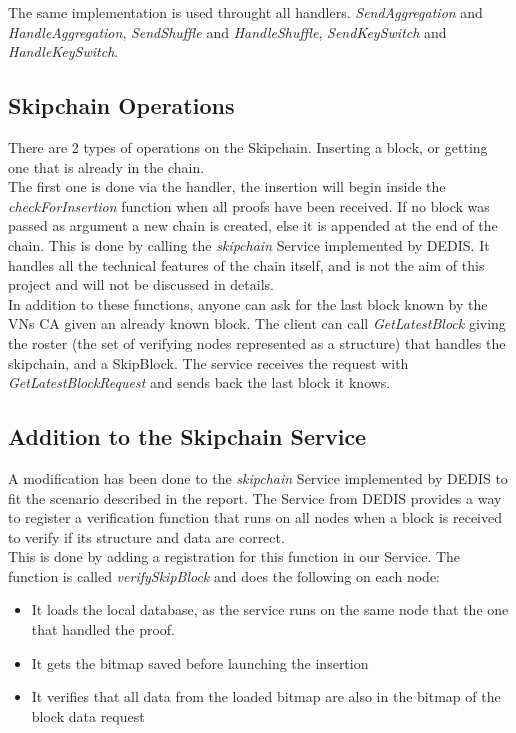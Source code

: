 \documentclass{article}
\begin{document}
The same implementation is used throught all handlers. \textit{SendAggregation} and \textit{HandleAggregation}, \textit{SendShuffle} and \textit{HandleShuffle}, \textit{SendKeySwitch} and \textit{HandleKeySwitch}.

\subsection{Skipchain Operations}
There are 2 types of operations on the Skipchain. Inserting a block, or getting one that is already in the chain.\\
The first one is done via the handler, the insertion will begin inside the \textit{checkForInsertion} function when all proofs have been received. If no block was passed as argument a new chain is created, else it is appended at the end of the chain. This is done by calling the \textit{skipchain} Service implemented by DEDIS. It handles all the technical features of the chain itself, and is not the aim of this project and will not be discussed in details.\\
In addition to these functions, anyone can ask for the last block known by the VNs CA given an already known block. The client can call \textit{GetLatestBlock} giving the roster (the set of verifying nodes represented as a structure) that handles the skipchain, and a SkipBlock. The service receives the request with \textit{GetLatestBlockRequest} and sends back the last block it knows.

\subsection{Addition to the Skipchain Service}
A modification has been done to the \textit{skipchain} Service implemented by DEDIS to fit the scenario described in the report. The Service from DEDIS provides a way to register a  verification function that runs on all nodes when a block is received to verify if its structure and data are correct.\\
This is done by adding a registration for this function in our Service. The function is called \textit{verifySkipBlock} and does the following on each node:
\begin{itemize}
\item{It loads the local database, as the service runs on the same node that the one that handled the proof.}
\item{It gets the bitmap saved before launching the insertion}
\item{It verifies that all data from the loaded bitmap are also in the bitmap of the block data request}
\end{itemize}
\end{document}
